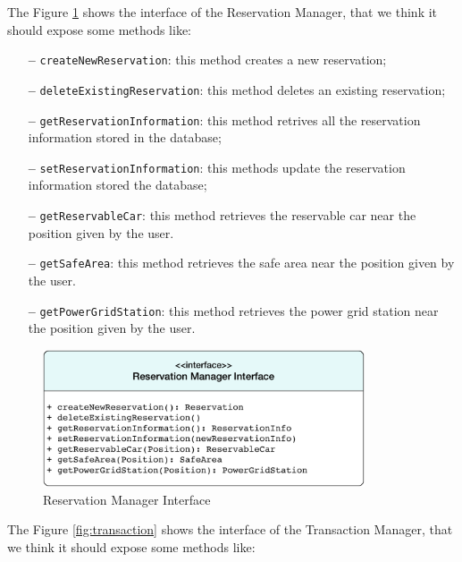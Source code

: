\newline
The Figure \ref{fig:reservation} shows the interface of the Reservation Manager, that we think it should expose some methods like:

\begin{itemize}
\item[\textbf{--}] \texttt{createNewReservation}: this method creates a new reservation;
\item[\textbf{--}] \texttt{deleteExistingReservation}: this method deletes an existing reservation;
\item[\textbf{--}] \texttt{getReservationInformation}: this method retrives all the reservation information stored in the database;
\item[\textbf{--}] \texttt{setReservationInformation}: this methods update the reservation information stored the database;
\item[\textbf{--}] \texttt{getReservableCar}: this method retrieves the reservable car near the position given by the user.
\item[\textbf{--}] \texttt{getSafeArea}: this method retrieves the safe area near the position given by the user.
\item[\textbf{--}] \texttt{getPowerGridStation}: this method retrieves the power grid station near the position given by the user.
\end{itemize}

\begin{figure}[htbp]
\centering
\vspace{36pt}
\includegraphics[width=0.85\textwidth]{Images/ReservationManager.pdf}
\vspace{10pt}
\caption{Reservation Manager Interface}
\label{fig:reservation}
\end{figure}
\clearpage

\newline
The Figure \ref{fig:transaction} shows the interface of the Transaction Manager, that we think it should expose some methods like:

